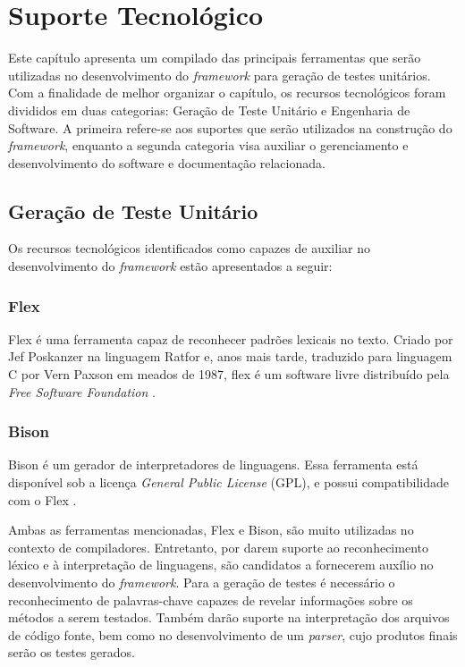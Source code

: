 \chapter[Suporte Tecnológico]{Suporte Tecnológico}
Este capítulo apresenta um compilado das principais ferramentas que serão utilizadas no desenvolvimento do \textit{framework} para geração de testes unitários. Com a finalidade de melhor organizar o capítulo, os recursos tecnológicos foram divididos em duas categorias: Geração de Teste Unitário e Engenharia de Software. A primeira refere-se aos suportes que serão utilizados na construção do \textit{framework}, enquanto a segunda categoria visa auxiliar o gerenciamento e desenvolvimento do software e documentação relacionada.

\section{Geração de Teste Unitário}
Os recursos tecnológicos identificados como capazes de auxiliar no desenvolvimento do \textit{framework} estão apresentados a seguir:

\subsection{Flex}
Flex é uma ferramenta capaz de reconhecer padrões lexicais no texto. Criado por Jef Poskanzer na linguagem Ratfor e, anos mais tarde, traduzido para linguagem C por Vern Paxson em meados de 1987, flex é um software livre distribuído pela \textit{Free Software Foundation} \cite{flex2008}.

\subsection{Bison}
Bison é um gerador de interpretadores de linguagens. Essa ferramenta está disponível sob a licença \textit{General Public License} (GPL), e possui compatibilidade com o Flex \cite{bison2014}.
\par
\indent Ambas as ferramentas mencionadas, Flex e Bison, são muito utilizadas no contexto de compiladores. Entretanto, por darem suporte ao reconhecimento léxico e à interpretação de linguagens, são candidatos a fornecerem auxílio no desenvolvimento do \textit{framework}. Para a geração de testes é necessário o reconhecimento de palavras-chave capazes de revelar informações sobre os métodos a serem testados. Também darão suporte na interpretação dos arquivos de código fonte, bem como no desenvolvimento de um \textit{parser}, cujo produtos finais serão os testes gerados.

